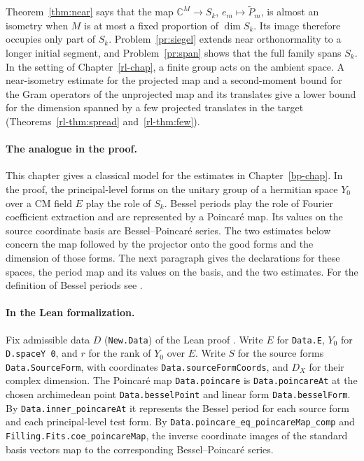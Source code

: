 \documentclass[reqno]{amsart}
\newcounter{chap}
\theoremstyle{definition}
\theoremstyle{plain}
\newcommand{\C}{\mathbb{C}}
\newcommand{\Pt}{\widetilde{P}}
\begin{document}
Theorem~\ref{thm:near} says that the map \(\C^M \to S_k\), \(e_m \mapsto \Pt_m\), is almost an isometry when \(M\) is at most a fixed proportion of \(\dim S_k\).  Its image therefore occupies only part of \(S_k\).  Problem~\ref{pr:siegel} extends near orthonormality to a longer initial segment, and Problem~\ref{pr:span} shows that the full family spans \(S_k\).  In the setting of Chapter~\ref{rl-chap}, a finite group acts on the ambient space.  A near-isometry estimate for the projected map and a second-moment bound for the Gram operators of the unprojected map and its translates give a lower bound for the dimension spanned by a few projected translates in the target (Theorems~\ref{rl-thm:spread} and~\ref{rl-thm:few}).

\paragraph{The analogue in the proof.}
This chapter gives a classical model for the estimates in Chapter~\ref{bp-chap}.  In the proof, the principal-level forms on the unitary group of a hermitian space \(Y_0\) over a CM field \(E\) play the role of \(S_k\).  Bessel periods play the role of Fourier coefficient extraction and are represented by a Poincar\'e map.  Its values on the source coordinate basis are Bessel--Poincar\'e series.  The two estimates below concern the map followed by the projector onto the good forms and the dimension of those forms.  The next paragraph gives the declarations for these spaces, the period map and its values on the basis, and the two estimates.  For the definition of Bessel periods see \cite[\S\S12, 23]{GGP}.

\paragraph{In the Lean formalization.}
Fix admissible data \(D\) (\texttt{New.Data}) of the Lean proof \cite{GL}.  Write \(E\) for \texttt{Data.E}, \(Y_0\) for \texttt{D.spaceY 0}, and \(r\) for the rank of \(Y_0\) over \(E\).  Write \(S\) for the source forms \texttt{Data.SourceForm}, with coordinates \texttt{Data.sourceFormCoords}, and \(D_X\) for their complex dimension.  The Poincar\'e map \texttt{Data.poincare} is \texttt{Data.poincareAt} at the chosen archimedean point \texttt{Data.besselPoint} and linear form \texttt{Data.besselForm}.  By \texttt{Data.inner\_poincareAt} it represents the Bessel period for each source form and each principal-level test form.  By \texttt{Data.poincare\_eq\_poincareMap\_comp} and \texttt{Filling.Fits.coe\_poincareMap}, the inverse coordinate images of the standard basis vectors map to the corresponding Bessel--Poincar\'e series.
\end{document}
